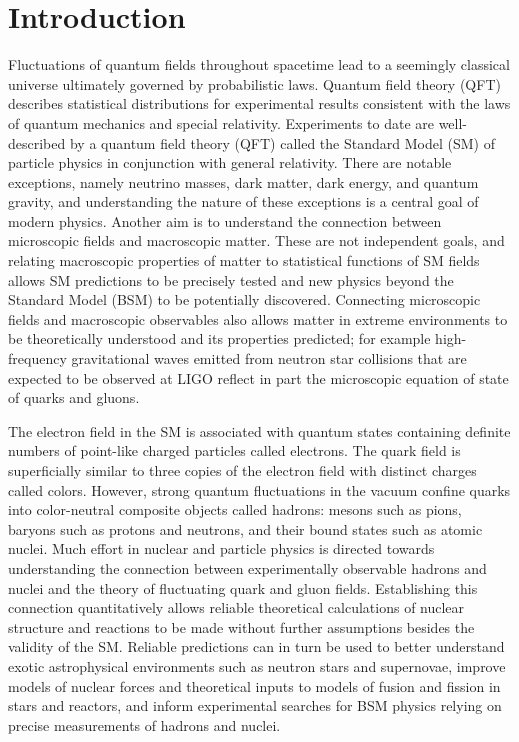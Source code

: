\chapter{Introduction}
 
Fluctuations of quantum fields throughout spacetime lead to a seemingly classical universe ultimately governed by probabilistic laws.
Quantum field theory (QFT) describes statistical distributions for experimental results consistent with the laws of quantum mechanics and special relativity.
Experiments to date are well-described by a quantum field theory (QFT) called the Standard Model (SM) of particle physics in conjunction with general relativity.
There are notable exceptions,
namely neutrino masses, dark matter, dark energy, and  quantum gravity, 
and understanding the nature of these exceptions is a central goal of modern physics.
Another aim is to understand the connection between microscopic fields and macroscopic matter.
These are not independent goals, and relating macroscopic properties of matter to statistical functions of SM fields allows SM predictions to be precisely tested and new physics beyond the Standard Model (BSM) to be potentially discovered.
Connecting microscopic fields and macroscopic observables also allows matter in extreme environments to be theoretically understood and its properties predicted;
for example high-frequency gravitational waves emitted from neutron star collisions
that are expected to be observed at LIGO
reflect in part the microscopic equation of state of quarks and gluons.

The electron field in the SM is associated with quantum states containing definite numbers of point-like charged particles called electrons.
The quark field is superficially similar to three copies of the electron field with distinct charges called colors.
However, strong quantum fluctuations in the vacuum confine quarks into color-neutral composite objects called hadrons:
mesons such as pions, baryons such as protons and neutrons, and their bound states such as atomic nuclei.
Much effort in nuclear and particle physics is directed towards understanding the connection between experimentally observable hadrons and nuclei and the theory of fluctuating quark and gluon fields.
Establishing this connection quantitatively allows
reliable theoretical calculations of nuclear structure and reactions
to be made without further assumptions besides the validity of the SM.
Reliable predictions can in turn be used to 
better understand exotic astrophysical environments such as neutron stars and supernovae,
improve models of nuclear forces and theoretical inputs to models of fusion and fission in stars and reactors,
and inform experimental searches for BSM physics relying on precise measurements of hadrons and nuclei.

